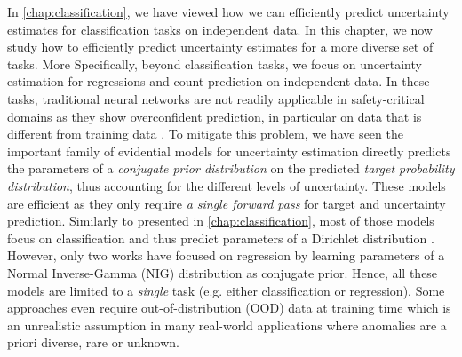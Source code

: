 
In \cref{chap:classification}, we have viewed how we can efficiently predict uncertainty estimates for classification tasks on independent data. In this chapter, we now study how to efficiently predict uncertainty estimates for a more diverse set of tasks. More Specifically, beyond classification tasks, we focus on uncertainty estimation for regressions and count prediction on independent data.
In these tasks, traditional neural networks are not readily applicable in safety-critical domains as they show overconfident prediction, in particular on data that is different from training data \citep{calibration-network, ensembles}. To mitigate this problem, we have seen the important family of evidential models for uncertainty estimation directly predicts the parameters of a \emph{conjugate prior distribution} on the predicted \emph{target probability distribution}, thus accounting for the different levels of uncertainty. These models are efficient as they only require \emph{a single forward pass} for target and uncertainty prediction. Similarly to \PostNetacro{} presented in \cref{chap:classification}, most of those models focus on classification and thus predict parameters of a Dirichlet distribution \citep{uceloss,PriorNetworks,reverse-kl,max_gap_id_ood,uncertainty-generative-classifier,multifaceted_uncertainty,graph-postnet,graph_uncertainty, lightweight-prob-net}. However, only two works \citep{evidential-regression, regression-priornet} have focused on regression by learning parameters of a Normal Inverse-Gamma (NIG) distribution as conjugate prior. Hence, all these models are limited to a \emph{single} task (e.g. either classification or regression). Some approaches even require out-of-distribution (OOD) data at training time \citep{PriorNetworks, reverse-kl} which is an unrealistic assumption in many real-world applications where anomalies are a priori diverse, rare or unknown.

